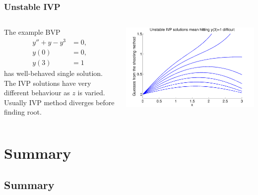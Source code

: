 \documentclass{beamer}
\begin{document}
\begin{frame}
  \frametitle{Unstable IVP}

  \begin{columns}
    \begin{column}{0.5\textwidth}
      The example BVP
      \begin{align*}
        y'' + y - y^3  &= 0, \\ y(0) & = 0, \\ y(3) & = 1
      \end{align*}
      has well-behaved single solution. The IVP solutions have very
      different behaviour as $z$ is varied. Usually IVP method
      diverges before finding root.
    \end{column}
    \begin{column}{0.5\textwidth}
      \begin{center}
        \includegraphics[width=\textwidth]{figures/ShootingProblem3}
      \end{center}
    \end{column}
  \end{columns}
\end{frame}


\section{Summary}

\subsection{Summary}
\end{document}
